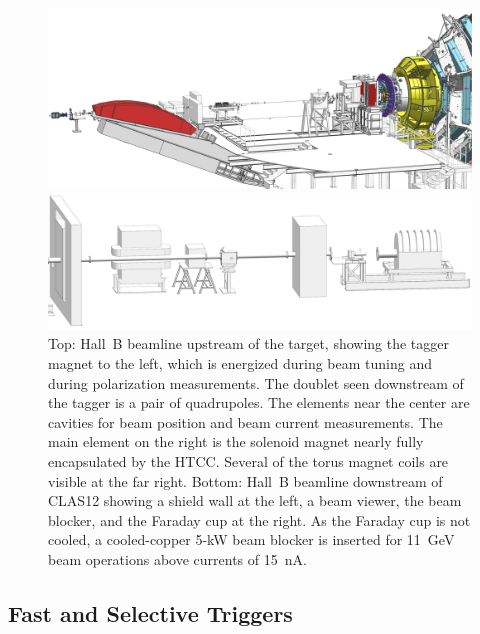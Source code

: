 \documentclass[final,3p,twocolumn]{elsarticle}
\begin{document}
\begin{figure}[t!]
\centerline{\includegraphics[width=1.8\columnwidth]{beamline-1.png}}
\centerline{\includegraphics[width=1.8\columnwidth]{beamline-3.png}}
\caption{Top: Hall~B beamline upstream of the target, showing the tagger magnet to the left, which is energized
  during beam tuning and during polarization measurements. The doublet seen downstream of the tagger is a pair
  of quadrupoles. The elements near the center are cavities for beam position and beam current measurements. The
  main element on the right is the solenoid magnet nearly fully encapsulated by the HTCC. Several of the torus
  magnet coils are visible at the far right. Bottom: Hall~B beamline downstream of CLAS12 showing a shield wall at
  the left, a beam viewer, the beam blocker, and the Faraday cup at the right. As the Faraday cup is not cooled, a
  cooled-copper 5-kW beam blocker is inserted for 11~GeV beam operations above currents of 15~nA.}
\label{beamline}
\end{figure}

\subsection{Fast and Selective Triggers} 
\end{document}
